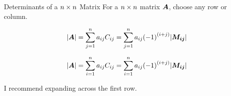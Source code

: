 \documentclass{beamer}
\begin{document}
\begin{frame}
\begin{block}{Determinants of a $n \times n$ Matrix}
For a $n \times n$ matrix $\boldsymbol{A}$, choose any row or column.
\begin{description}
\item<2->[\textbf{Expansion by the $\boldsymbol{i}$th row:}]
\begin{equation*}
{\left\lvert \boldsymbol{A}\right\rvert} = \sum_{j=1}^{n} a_{ij}C_{ij}
              = \sum_{j=1}^{n} a_{ij}{(-1)}^{(i+j)}{\left\lvert \boldsymbol{M_{ij}}\right\rvert}
\end{equation*}
\item<3->[\textbf{Expansion by the $\boldsymbol{j}$th column:}]
\begin{equation*}
{\left\lvert \boldsymbol{A}\right\rvert} = \sum_{i=1}^{n} a_{ij}C_{ij}
              = \sum_{i=1}^{n} a_{ij}{(-1)}^{(i+j)}{\left\lvert \boldsymbol{M_{ij}}\right\rvert}
\end{equation*}
\end{description}
\end{block}
\begin{block}{}
I recommend expanding across the first row.
\end{block}
\end{frame}
\end{document}
